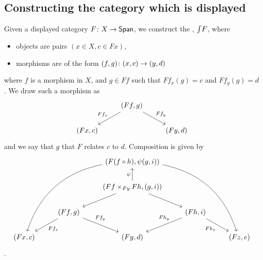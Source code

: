 
\subsection*{Constructing the category which is displayed}

Given a displayed category $F \colon X \to \mathsf{Span}$, we construct the , $\textstyle{\int} F$, where
\begin{itemize}
    \item objects are pairs $(x \in X, c \in Fx)$,
   \item morphisms are of the form $(f,g) \colon (x,c) \to (y,d)$
\end{itemize}
where $f$ is a morphism in $X$, and $g \in Ff$ such that $Ff_x(g) = c$ and $Ff_y(g) = d$. We draw such a morphism as 
\[
\begin{tikzcd}
    &
    (Ff,g)
    \arrow[dl, swap, "Ff_x"]
    \arrow[dr, "Ff_y"]
    \\
    (Fx,c)
    &&
    (Fy,d)
\end{tikzcd}\]
and we say that $g$  that $F$ relates $c$ to $d$. Composition is given by 
\[
\begin{tikzcd}
    &&
    (F(f \circ h), \psi(g,i))
    \arrow[dddll, bend right]
    \arrow[dddrr, bend left]
    \\&&
    (Ff \times_{Fy} Fh, (g,i))
    \arrow[dl]
    \arrow[dr]
    \arrow[u, "\psi"]
    \\
    &
    (Ff, g)
    \arrow[dl, "Ff_x"]
    \arrow[dr, "Ff_y", pos = 0.3]
    &&
    (Fh, i)
    \arrow[dl, swap, "Fh_y", pos = 0.3]
    \arrow[dr, swap, "Fh_z"]
    \\
    (Fx, c)
    &
    &
    (Fy, d)
    &
    &
    (Fz, e)
\end{tikzcd}\]
.

